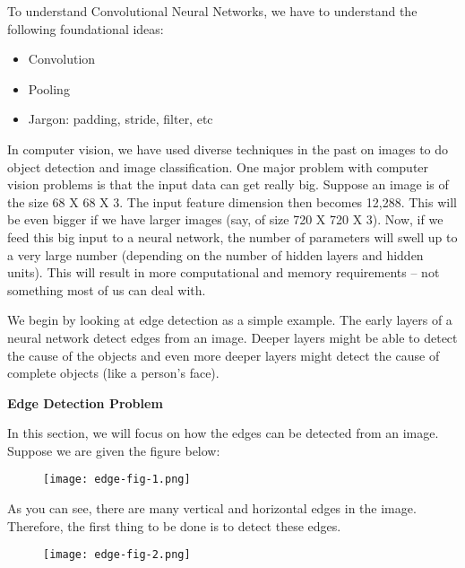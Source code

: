 \doublespacing
\setlength{\parindent}{1cm}

To understand Convolutional Neural Networks, we have to understand the following foundational ideas:

\begin{itemize}
  \item Convolution
  \item Pooling
  \item Jargon: padding, stride, filter, etc
\end{itemize}

In computer vision, we have used diverse techniques in the past on images to do object detection and image classification. One major problem with computer vision problems is that the input data can get really big. Suppose an image is of the size 68 X 68 X 3. The input feature dimension then becomes 12,288. This will be even bigger if we have larger images (say, of size 720 X 720 X 3). Now, if we feed this big input to a neural network, the number of parameters will swell up to a very large number (depending on the number of hidden layers and hidden units). This will result in more computational and memory requirements – not something most of us can deal with. \par

We begin by looking at edge detection as a simple example. The early layers of a neural network detect edges from an image. Deeper layers might be able to detect the cause of the objects and even more deeper layers might detect the cause of complete objects (like a person’s face). \par

\textbf{Edge Detection Problem}

In this section, we will focus on how the edges can be detected from an image. Suppose we are given the figure below:

\begin{figure}
  \texttt{[image: edge-fig-1.png]}
\end{figure}

As you can see, there are many vertical and horizontal edges in the image. Therefore, the first thing to be done is to detect these edges.

\begin{figure}
  \texttt{[image: edge-fig-2.png]}
\end{figure}
